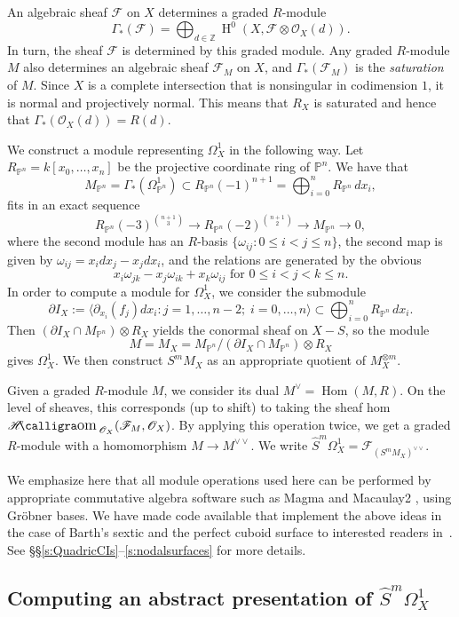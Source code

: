 \documentclass[12pt, reqno]{amsart}
\theoremstyle{definition}
\newcommand{\PP}{{\mathbb P}}
\newcommand{\Z}{{\mathbb Z}}
\newcommand{\sF}{{\mathscr F}}
\newcommand{\sO}{{\mathscr O}}
\DeclareMathOperator{\sHom}{\mathscr{H}\text{\kern -4pt {\calligra\large om}}\,}
\DeclareMathOperator{\HH}{H}
\DeclareMathOperator{\Hom}{Hom}
\numberwithin{equation}{section}
\numberwithin{table}{section}
\begin{document}
An algebraic sheaf $\sF$ on $X$ determines a graded $R$-module
\[\Gamma_*(\sF)=\bigoplus_{d\in\Z} \HH^0(X,\sF\otimes\sO_X(d)).\]
In turn, the sheaf $\sF$ is determined by this graded module. Any graded $R$-module $M$ also determines an algebraic sheaf $\sF_M$ on $X$, and $\Gamma_*(\sF_M)$ is the \emph{saturation} of $M$. Since $X$ is a complete intersection that is nonsingular in codimension $1$, it is normal and projectively normal. This means that $R_X$ is saturated and hence that $\Gamma_*(\sO_X(d))=R(d)$.

We construct a module representing $\Omega_X^1$ in the following way.
Let $R_{\PP^n}=k[x_0,\ldots,x_n]$ be the projective coordinate ring of $\PP^n$. We have that
\[M_{\PP^n}=\Gamma_*(\Omega^1_{\PP^n})\subset R_{\PP^n}(-1)^{n+1}=\bigoplus_{i=0}^n R_{\PP^n}\,dx_i,\]
fits in an exact sequence
\[R_{\PP^n}(-3)^{\binom{n+1}{3}}\to R_{\PP^n}(-2)^{\binom{n+1}{2}}\to M_{\PP^n}\to 0,\]
where the second module has an $R$-basis $\{\omega_{ij}: 0\leq i < j \leq n\}$, the second map is given by $\omega_{ij}=x_idx_j-x_jdx_i$, and the relations are generated by the obvious
\[x_i\omega_{jk}-x_j\omega_{ik}+x_k\omega_{ij}\text{ for }0\leq i<j<k\leq n.\]
In order to compute a module for $\Omega^1_X$, we consider the submodule
\[\partial I_X:=\langle \partial_{x_i}(f_j) dx_i: j=1,\ldots,n-2;\; i=0,\ldots,n\rangle\subset \bigoplus_{i=0}^n R_{\PP^n}\,dx_i.\]
Then $(\partial I_X \cap M_{\PP^n})\otimes R_X$ yields the conormal sheaf on $X-S$, so the module 
\[M=M_X=M_{\PP^n}/(\partial I_X \cap M_{\PP^n})\otimes R_X\]
gives $\Omega^1_X$. We then construct $S^m M_X$ as an appropriate quotient of $M^{\otimes m}_X$.

Given a graded $R$-module $M$, we consider its dual $M^\vee=\Hom(M,R)$. 
On the level of sheaves, this corresponds (up to shift) to taking the sheaf hom $\sHom_{\sO_X}(\sF_M,\sO_X)$.
By applying this operation twice, we get a graded $R$-module with a homomorphism $M\to M^{\vee\vee}$. We write $\hat{S}^m\Omega^1_X=\sF_{(S^mM_X)^{\vee\vee}}$.

We emphasize here that all module operations used here can be performed by appropriate commutative algebra software such as Magma \cite{magma} and Macaulay2 \cite{M2}, using Gr\"obner bases. We have made code  available that implement the above ideas in the case of Barth's sextic and the perfect cuboid surface to interested readers in~\cite{electronic}.  See \S\S\ref{s:QuadricCIs}--\ref{s:nodalsurfaces} for more details.

\subsection{Computing an abstract presentation of $\hat{S}^m\Omega^1_X$}
\end{document}

